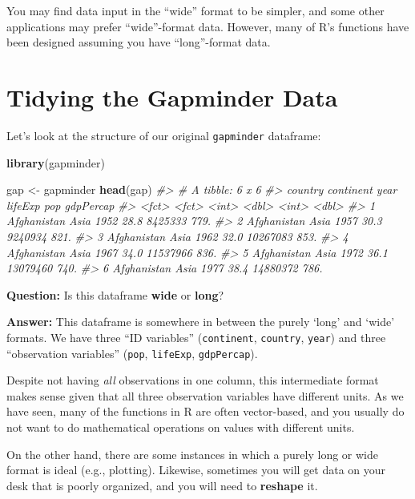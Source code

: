 \documentclass[]{book}
\newenvironment{Shaded}{\begin{snugshade}}{\end{snugshade}}
\newcommand{\KeywordTok}[1]{\textcolor[rgb]{0.13,0.29,0.53}{\textbf{#1}}}
\newcommand{\StringTok}[1]{\textcolor[rgb]{0.31,0.60,0.02}{#1}}
\newcommand{\CommentTok}[1]{\textcolor[rgb]{0.56,0.35,0.01}{\textit{#1}}}
\newcommand{\NormalTok}[1]{#1}
\begin{document}
You may find data input in the ``wide'' format to be simpler, and some
other applications may prefer ``wide''-format data. However, many of R's
functions have been designed assuming you have ``long''-format data.

\section{Tidying the Gapminder Data}\label{tidying-the-gapminder-data}

Let's look at the structure of our original \texttt{gapminder}
dataframe:

\begin{Shaded}
\begin{Highlighting}[]
\KeywordTok{library}\NormalTok{(gapminder)}

\NormalTok{gap <-}\StringTok{ }\NormalTok{gapminder}
\KeywordTok{head}\NormalTok{(gap)}
\CommentTok{#> # A tibble: 6 x 6}
\CommentTok{#>   country     continent  year lifeExp      pop gdpPercap}
\CommentTok{#>   <fct>       <fct>     <int>   <dbl>    <int>     <dbl>}
\CommentTok{#> 1 Afghanistan Asia       1952    28.8  8425333      779.}
\CommentTok{#> 2 Afghanistan Asia       1957    30.3  9240934      821.}
\CommentTok{#> 3 Afghanistan Asia       1962    32.0 10267083      853.}
\CommentTok{#> 4 Afghanistan Asia       1967    34.0 11537966      836.}
\CommentTok{#> 5 Afghanistan Asia       1972    36.1 13079460      740.}
\CommentTok{#> 6 Afghanistan Asia       1977    38.4 14880372      786.}
\end{Highlighting}
\end{Shaded}

\textbf{Question:} Is this dataframe \textbf{wide} or \textbf{long}?

\textbf{Answer:} This dataframe is somewhere in between the purely
`long' and `wide' formats. We have three ``ID variables''
(\texttt{continent}, \texttt{country}, \texttt{year}) and three
``observation variables'' (\texttt{pop}, \texttt{lifeExp},
\texttt{gdpPercap}).

Despite not having \emph{all} observations in one column, this
intermediate format makes sense given that all three observation
variables have different units. As we have seen, many of the functions
in R are often vector-based, and you usually do not want to do
mathematical operations on values with different units.

On the other hand, there are some instances in which a purely long or
wide format is ideal (e.g., plotting). Likewise, sometimes you will get
data on your desk that is poorly organized, and you will need to
\textbf{reshape} it.
\end{document}
